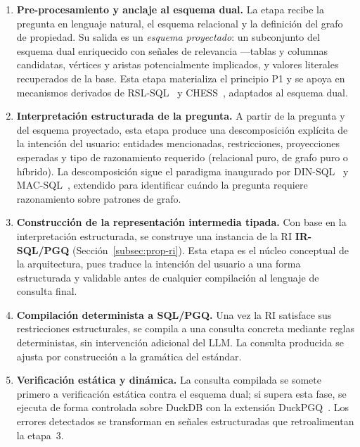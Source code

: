 \begin{enumerate}
    \item \textbf{Pre-procesamiento y anclaje al esquema dual.} La etapa recibe la pregunta en lenguaje natural, el esquema relacional y la definición del grafo de propiedad. Su salida es un \emph{esquema proyectado}: un subconjunto del esquema dual enriquecido con señales de relevancia ---tablas y columnas candidatas, vértices y aristas potencialmente implicados, y valores literales recuperados de la base. Esta etapa materializa el principio P1 y se apoya en mecanismos derivados de \textsc{RSL-SQL}~\cite{RSL-SQL2024} y \textsc{CHESS}~\cite{CHESS2024}, adaptados al esquema dual.

    \item \textbf{Interpretación estructurada de la pregunta.} A partir de la pregunta y del esquema proyectado, esta etapa produce una descomposición explícita de la intención del usuario: entidades mencionadas, restricciones, proyecciones esperadas y tipo de razonamiento requerido (relacional puro, de grafo puro o híbrido). La descomposición sigue el paradigma inaugurado por \textsc{DIN-SQL}~\cite{DIN-SQL2023} y \textsc{MAC-SQL}~\cite{MAC-SQL2023}, extendido para identificar cuándo la pregunta requiere razonamiento sobre patrones de grafo.

    \item \textbf{Construcción de la representación intermedia tipada.} Con base en la interpretación estructurada, se construye una instancia de la \ac{RI} \textbf{IR-SQL/PGQ} (Sección~\ref{subsec:prop-ri}). Esta etapa es el núcleo conceptual de la arquitectura, pues traduce la intención del usuario a una forma estructurada y validable antes de cualquier compilación al lenguaje de consulta final.

    \item \textbf{Compilación determinista a \ac{SQL}/\ac{PGQ}.} Una vez la \ac{RI} satisface sus restricciones estructurales, se compila a una consulta concreta mediante reglas deterministas, sin intervención adicional del \ac{LLM}. La consulta producida se ajusta por construcción a la gramática del estándar.

    \item \textbf{Verificación estática y dinámica.} La consulta compilada se somete primero a verificación estática contra el esquema dual; si supera esta fase, se ejecuta de forma controlada sobre DuckDB con la extensión DuckPGQ~\cite{DuckPGQ}. Los errores detectados se transforman en señales estructuradas que retroalimentan la etapa~3.
\end{enumerate}

